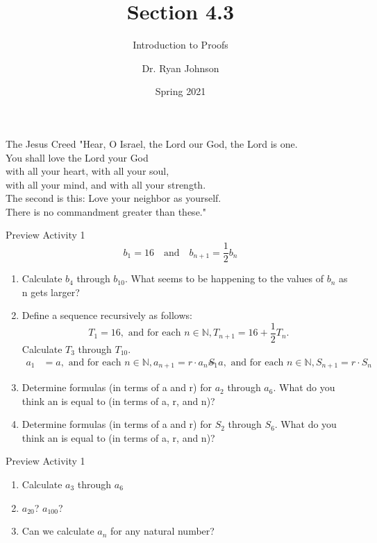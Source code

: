 \documentclass{beamer}
\title{Section 4.3}
\subtitle{Introduction to Proofs}
\author{Dr. Ryan Johnson}
\institute{Grace College}
\date{Spring 2021}
\newcounter{saveenumi}
\newcommand{\seti}{\setcounter{saveenumi}{\value{enumi}}}
\newcommand{\conti}{\setcounter{enumi}{\value{saveenumi}}}
\begin{document}
\begin{frame}[plain]
    \maketitle
\end{frame}

\begin{frame}{The Jesus Creed}
\Large{
"Hear, O Israel, the Lord our God, the Lord is one.\\
You shall love the Lord your God\\
\;\; with all your heart, with all your soul,\\
\;\; with all your mind, and with all your strength.\\
The second is this: Love your neighbor as yourself.\\
There is no commandment greater than these."
}
\end{frame}

\begin{frame}{Preview Activity 1}
    \[b_1 = 16 \ \ \ \text{ and } \ \ \ b_{n+1} = \frac{1}{2} b_n \]
    \begin{enumerate}
        \item Calculate $b_4$ through $b_{10}$. What seems to be happening to the values of $b_n$ as n gets larger? \pause
        \item Define a sequence recursively as follows:
        \[
        T_1 = 16, \text{ and for each } n \in \mathbb{N}, T_{n+1} = 16 + \frac{1}{2}T_n.
        \]
        Calculate $T_3$ through $T_{10}$. \pause
        \begin{align*}
            a_1 &= a, \text{ and for each } n \in \mathbb{N}, a_{n+1} = r \cdot a_n
            S_1 &= a, \text{ and for each } n \in \mathbb{N}, S_{n+1} = r \cdot S_n
        \end{align*}
        \item Determine formulas (in terms of a and r) for $a_2$ through $a_6$. What do you think an is equal to (in terms of a, r, and n)? \pause
        \item Determine formulas (in terms of a and r) for $S_2$ through $S_6$. What do you think an is equal to (in terms of a, r, and n)? 
        \seti
    \end{enumerate}
\end{frame}

\begin{frame}{Preview Activity 1}
    \begin{enumerate}
        \conti
        \[a_1 = 1\ \ \ \text{ and } a_{n+1} = (n+1)a_n\]
        \item Calculate $a_3$ through $a_6$ \pause
        \item $a_{20}$? $a_{100}$? \pause
        \item Can we calculate $a_n$ for any natural number?
    \end{enumerate}
\end{frame}
\end{document}
